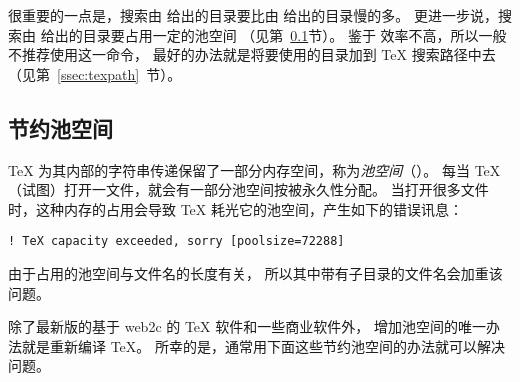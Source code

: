很重要的一点是，搜索由  给出的目录要比由  给出的目录慢的多。
更进一步说，搜索由  给出的目录要占用一定的池空间
（见第~\ref{ssec:poolspace}节）。
鉴于  效率不高，所以一般不推荐使用这一命令，
最好的办法就是将要使用的目录加到 \TeX{} 搜索路径中去（见第~\ref{ssec:texpath}~节）。


\subsection{节约池空间}\label{ssec:poolspace}

\TeX{} 为其内部的字符串传递保留了一部分内存空间，称为\emph{池空间}（）。
每当 \TeX{} （试图）打开一文件，就会有一部分池空间按被永久性分配。
当打开很多文件时，这种内存的占用会导致 \TeX{} 耗光它的池空间，产生如下的错误讯息：
\begin{Verbatim}[xleftmargin=1cm]
! TeX capacity exceeded, sorry [poolsize=72288]
\end{Verbatim}

由于占用的池空间与文件名的长度有关，
所以其中带有子目录的文件名会加重该问题。

除了最新版的基于 web2c 的 \TeX{} 软件和一些商业软件外，
增加池空间的唯一办法就是重新编译 \TeX{}。
所幸的是，通常用下面这些节约池空间的办法就可以解决问题。

